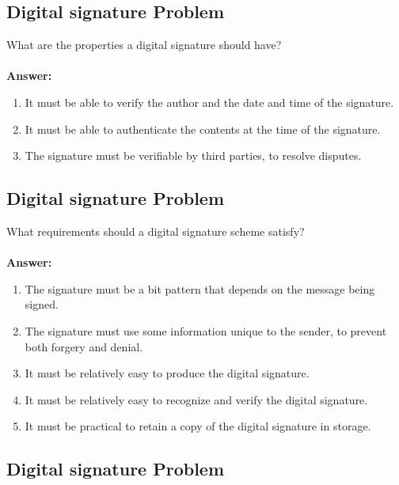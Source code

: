 \documentclass[paper=a4, fontsize=11pt]{scrartcl} %
\numberwithin{equation}{section} %
\numberwithin{figure}{section} %
\numberwithin{table}{section} %
\begin{document}
\subsection{Digital signature Problem \uppercase\expandafter{}}

What are the properties a digital signature should have?
\\
\\
\textbf{Answer:}
\begin{enumerate}
\item It must be able to verify the author and the date and time of the signature.
\item It must be able to authenticate the contents at the time of the signature.
\item The signature must be verifiable by third parties, to resolve disputes.
\end{enumerate}


\subsection{Digital signature Problem \uppercase\expandafter{}}

What requirements should a digital signature scheme satisfy?
\\
\\
\textbf{Answer:}
\begin{enumerate}
\item The signature must be a bit pattern that depends on the message being signed.
\item The signature must use some information unique to the sender, to prevent both forgery and denial.
\item It must be relatively easy to produce the digital signature.
\item It must be relatively easy to recognize and verify the digital signature.
\item It must be practical to retain a copy of the digital signature in storage.
\end{enumerate}


\subsection{Digital signature Problem \uppercase\expandafter{}}
\end{document}
